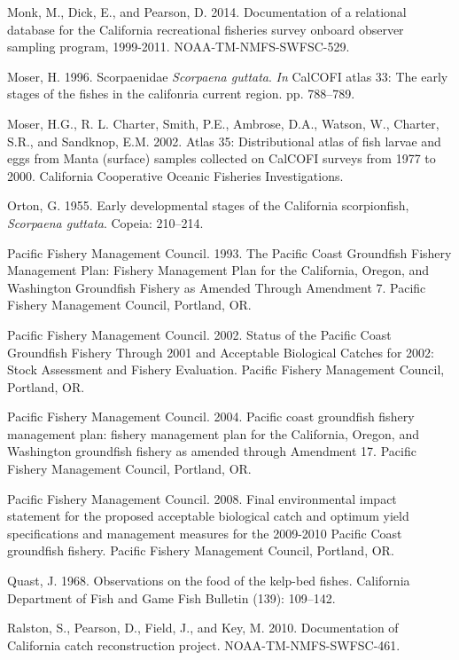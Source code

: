 \documentclass[12pt,]{article}
\begin{document}
\hypertarget{ref-Monk2014}{}
Monk, M., Dick, E., and Pearson, D. 2014. Documentation of a relational
database for the California recreational fisheries survey onboard
observer sampling program, 1999-2011. NOAA-TM-NMFS-SWFSC-529.

\hypertarget{ref-Moser1996}{}
Moser, H. 1996. Scorpaenidae \emph{Scorpaena guttata}. \emph{In} CalCOFI
atlas 33: The early stages of the fishes in the califonria current
region. pp. 788--789.

\hypertarget{ref-Moser2002}{}
Moser, H.G., R. L. Charter, Smith, P.E., Ambrose, D.A., Watson, W.,
Charter, S.R., and Sandknop, E.M. 2002. Atlas 35: Distributional atlas
of fish larvae and eggs from Manta (surface) samples collected on
CalCOFI surveys from 1977 to 2000. California Cooperative Oceanic
Fisheries Investigations.

\hypertarget{ref-Orton1955}{}
Orton, G. 1955. Early developmental stages of the California
scorpionfish, \emph{Scorpaena guttata}. Copeia: 210--214.

\hypertarget{ref-PFMC1993}{}
Pacific Fishery Management Council. 1993. The Pacific Coast Groundfish
Fishery Management Plan: Fishery Management Plan for the California,
Oregon, and Washington Groundfish Fishery as Amended Through Amendment
7. Pacific Fishery Management Council, Portland, OR.

\hypertarget{ref-PFMC2002}{}
Pacific Fishery Management Council. 2002. Status of the Pacific Coast
Groundfish Fishery Through 2001 and Acceptable Biological Catches for
2002: Stock Assessment and Fishery Evaluation. Pacific Fishery
Management Council, Portland, OR.

\hypertarget{ref-PFMC2004}{}
Pacific Fishery Management Council. 2004. Pacific coast groundfish
fishery management plan: fishery management plan for the California,
Oregon, and Washington groundfish fishery as amended through Amendment
17. Pacific Fishery Management Council, Portland, OR.

\hypertarget{ref-PFMC2008}{}
Pacific Fishery Management Council. 2008. Final environmental impact
statement for the proposed acceptable biological catch and optimum yield
specifications and management measures for the 2009-2010 Pacific Coast
groundfish fishery. Pacific Fishery Management Council, Portland, OR.

\hypertarget{ref-Quast1968}{}
Quast, J. 1968. Observations on the food of the kelp-bed fishes.
California Department of Fish and Game Fish Bulletin (139): 109--142.

\hypertarget{ref-Ralston2010}{}
Ralston, S., Pearson, D., Field, J., and Key, M. 2010. Documentation of
California catch reconstruction project. NOAA-TM-NMFS-SWFSC-461.
\end{document}
